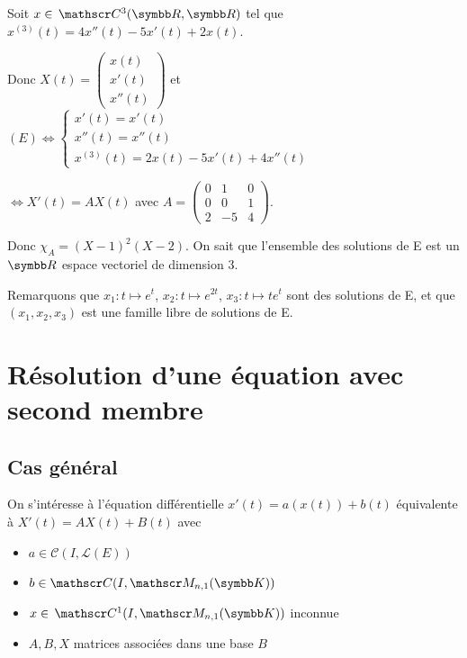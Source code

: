 \begin{exemple}
    Soit $x \in \mc 3 (\R, \R)$ tel que $x^{(3)}(t) = 4x''(t) - 5x'(t) + 2x(t)$.

    Donc $X(t) = \begin{pmatrix}
    x(t) \\ x'(t) \\ x''(t)
    \end{pmatrix}$ et 
    $(E) \Leftrightarrow \begin{cases}
    x'(t) = x'(t) \\
    x''(t) = x''(t) \\
    x^{(3)}(t) = 2x(t) - 5x'(t) + 4x''(t)
    \end{cases}$

    $\Leftrightarrow X'(t) = AX(t)$ avec $A = \begin{pmatrix}
    0 & 1 & 0 \\
    0 & 0 & 1 \\
    2 & -5 & 4
    \end{pmatrix}$.

    Donc $\chi_A = (X - 1)^2 (X - 2)$. On sait que l'ensemble des solutions de E est un $\R$
    espace vectoriel de dimension 3. 

    Remarquons que $x_1 : t \mapsto e^t$, $x_2 : t \mapsto e^{2t}$, $x_3 : t \mapsto t e^t$ sont des solutions de E, 
    et que $(x_1, x_2, x_3)$ est une famille libre de solutions de E.  
\end{exemple}

\section{Résolution d'une équation avec second membre}
\subsection{Cas général}

On s'intéresse à l'équation différentielle 
$x'(t) = a(x(t)) + b(t)$ équivalente à $X'(t) = A X(t) + B(t)$ 
avec 
\begin{itemize}
    \item $a \in \mathscr C (I, \mathscr L(E))$
    \item $b \in \mathscr C (I, \mathscr M_{n, 1}(\K))$
    \item $x \in \mc 1 (I, \mathscr M_{n, 1}(\K))$ inconnue
    \item $A, B, X$ matrices associées dans une base $B$
\end{itemize}

